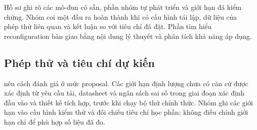 Hồ sơ ghi rõ các mô-đun có sẵn, phần nhóm tự phát triển và giới hạn đã kiểm chứng. Nhóm coi một đầu ra hoàn thành khi có cấu hình tái lập, dữ liệu của phép thử liên quan và kết luận so với tiêu chí đã đặt. Phần tìm hiểu reconfiguration bàn giao bằng nội dung lý thuyết và phân tích khả năng áp dụng.

\subsection{Phép thử và tiêu chí dự kiến}

 nêu cách đánh giá ở mức proposal. Các giới hạn định lượng chưa có căn cứ được xác định từ yêu cầu tải, datasheet và ngân sách sai số trong giai đoạn xác định đầu vào và thiết kế tích hợp, trước khi chạy bộ thử chính thức. Nhóm ghi các giới hạn vào cấu hình kiểm thử và đối chiếu tiêu chí học phần; không điều chỉnh giới hạn chỉ để phù hợp số liệu đã đo.

